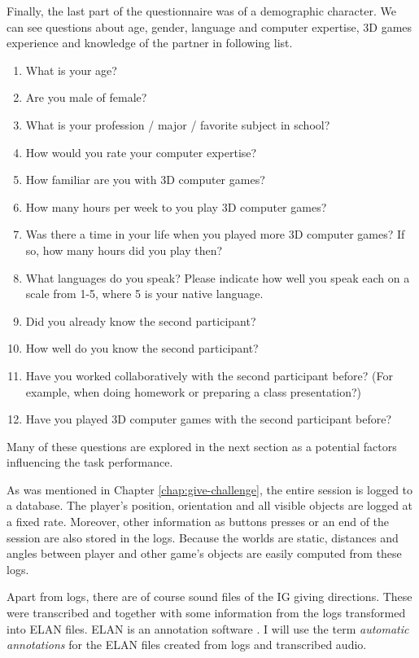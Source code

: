 Finally, the last part of the questionnaire was of a demographic character. We can see questions about age, gender, language and computer expertise, 3D games experience and knowledge of the partner in following list.

\begin{enumerate}
\item
What is your age?
\item
Are you male of female?
\item
What is your profession / major / favorite subject in school?
\item
How would you rate your computer expertise?
\item
How familiar are you with 3D computer games?
\item
How many hours per week to you play 3D computer games?
\item
Was there a time in your life when you played more 3D computer games? If so, how many hours did you play then?
\item
What languages do you speak? Please indicate how well you speak each on a scale from 1-5, where 5 is your native language.
\item
Did you already know the second participant?
\item
How well do you know the second participant?
\item
Have you worked collaboratively with the second participant before? (For example, when doing homework or preparing a class presentation?)
\item
Have you played 3D computer games with the second participant before?
\end{enumerate}

Many of these questions are explored in the next section as a potential factors influencing the task performance. 

As was mentioned in Chapter \ref{chap:give-challenge}, the entire session is logged to a database. The player's position, orientation and all visible objects are logged at a fixed rate. Moreover, other information as buttons presses or an end of the session are also stored in the logs. Because the worlds are static, distances and angles between player and other game's objects are easily computed from these logs.

Apart from logs, there are of course sound files of the IG giving directions. These were transcribed and together with some information from the logs transformed into ELAN files. ELAN is an annotation software \citep{sloetjes2008annotation}. I will use the term \textit{automatic annotations} for the ELAN files created from logs and transcribed audio. 

